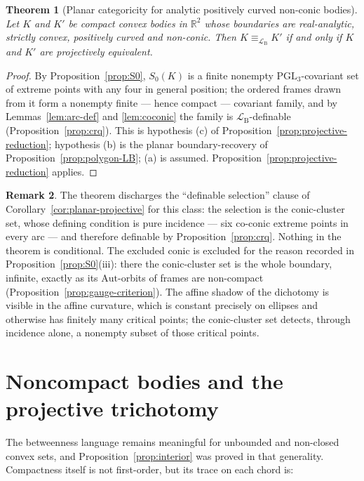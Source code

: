 \documentclass[11pt]{amsart}
\newtheorem{theorem}{Theorem}[section]
\theoremstyle{definition}
\newtheorem{remark}[theorem]{Remark}
\newcommand{\R}{\mathbb{R}}
\newcommand{\LB}{\mathcal{L}_{\mathrm{B}}}
\newcommand{\PGL}{\mathrm{PGL}}
\begin{document}
\begin{theorem}[Planar categoricity for analytic positively curved non-conic
bodies]\label{thm:planar-sextactic}
Let $K$ and $K'$ be
compact convex bodies in $\R^2$ whose boundaries are real-analytic,
strictly convex, positively curved and non-conic. Then
$K\equiv_{\LB}K'$ if and only if $K$ and $K'$ are projectively
equivalent.
\end{theorem}

\begin{proof}
By Proposition~\ref{prop:S0}, $S_0(K)$ is a finite nonempty
$\PGL_3$-covariant set of extreme points with any four in general position;
the ordered frames drawn from it form a nonempty finite --- hence compact ---
covariant family, and by Lemmas~\ref{lem:arc-def} and \ref{lem:coconic} the
family is $\LB$-definable (Proposition~\ref{prop:crq}). This is
hypothesis (c) of Proposition~\ref{prop:projective-reduction}; hypothesis (b)
is the planar boundary-recovery of Proposition~\ref{prop:polygon-LB}; (a) is
assumed. Proposition~\ref{prop:projective-reduction} applies.
\end{proof}

\begin{remark}
The theorem discharges the ``definable selection'' clause of
Corollary~\ref{cor:planar-projective} for this class: the selection is the
conic-cluster set, whose defining condition is pure incidence --- six co-conic
extreme points in every arc --- and therefore definable by
Proposition~\ref{prop:crq}. Nothing in the theorem is conditional. The
excluded conic is excluded for the reason
recorded in Proposition~\ref{prop:S0}(iii): there the conic-cluster set is the
whole boundary, infinite, exactly as its $\mathrm{Aut}$-orbits of frames are
non-compact (Proposition~\ref{prop:gauge-criterion}). The affine shadow of the
dichotomy is visible in the affine curvature, which is constant precisely on
ellipses and otherwise has finitely many critical points; the conic-cluster
set detects, through incidence alone, a nonempty subset of those critical
points.
\end{remark}

\section{Noncompact bodies and the projective trichotomy}\label{sec:noncompact}

The betweenness language remains meaningful for unbounded and non-closed
convex sets, and Proposition~\ref{prop:interior} was proved in that
generality. Compactness itself is not first-order, but its trace on each
chord is:
\end{document}
